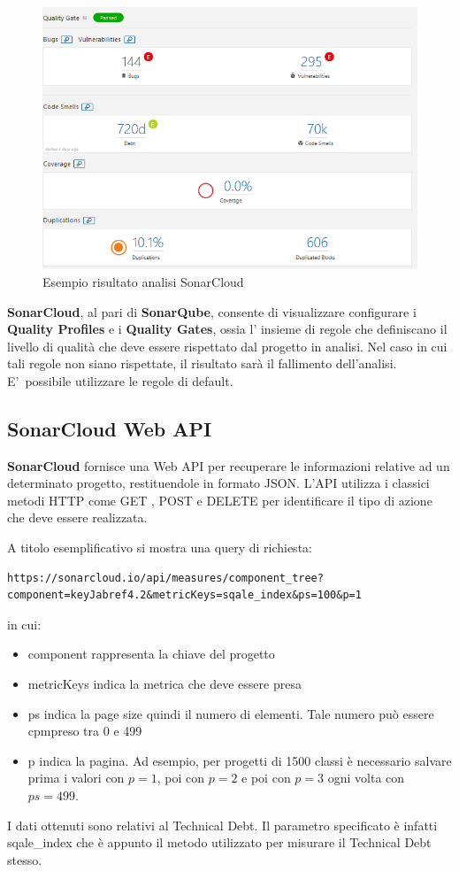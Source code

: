 \begin{figure}[htbp]
	\centering
	\includegraphics[scale=0.5, trim = 0cm 0cm 0cm 0cm, clip=true]{figSonarCloud/analisi.PNG}
	\caption{Esempio risultato analisi SonarCloud}
	\label{fig:analisi}
\end{figure}

\textbf{SonarCloud}, al pari di \textbf{SonarQube}, consente di visualizzare configurare i \textbf{Quality Profiles} e i \textbf{Quality Gates}, ossia l' insieme di regole che definiscano il livello di qualità che deve essere rispettato dal progetto in analisi. Nel caso in cui tali regole non siano rispettate, il risultato sarà il fallimento dell'analisi. E'\ possibile utilizzare le regole di default. 

\subsection{SonarCloud Web API}
\textbf{SonarCloud} fornisce una Web API per recuperare le informazioni relative ad un determinato progetto, restituendole in formato JSON. L'API utilizza i classici metodi HTTP come GET , POST e DELETE per identificare il tipo di azione che deve essere realizzata. 

A titolo esemplificativo si mostra una query di richiesta:
\begin{verbatim}
https://sonarcloud.io/api/measures/component_tree?
component=keyJabref4.2&metricKeys=sqale_index&ps=100&p=1
\end{verbatim}

in cui:
\begin{itemize}
	\item component rappresenta la chiave del progetto
	\item metricKeys indica la metrica che deve essere presa
	\item ps indica la page size quindi il numero di elementi. Tale numero può essere cpmpreso tra 0 e 499
	\item p indica la pagina. Ad esempio, per progetti di 1500 classi è necessario salvare prima i valori con $p=1$, poi con $p=2$ e poi con $p=3$ ogni volta con $ps=499$.
\end{itemize}

I dati ottenuti sono relativi al Technical Debt. Il parametro specificato è infatti sqale\_index che è appunto il metodo utilizzato per misurare il Technical Debt stesso. 